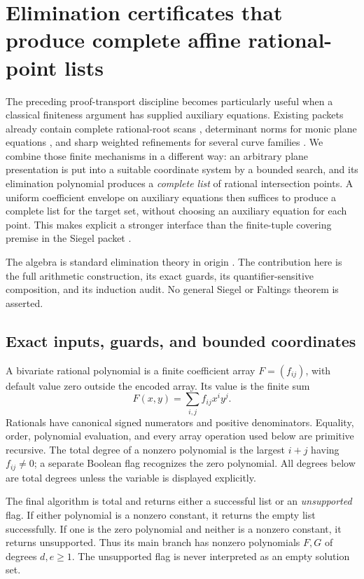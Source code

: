 \section{Elimination certificates that produce complete affine rational-point lists}
\label{sec:elimination}

The preceding proof-transport discipline becomes particularly useful when
a classical finiteness argument has supplied auxiliary equations.  Existing
packets already contain complete rational-root scans
\cite{repo-geometry}, determinant norms for monic plane equations
\cite{repo-demand}, and sharp weighted refinements for several curve
families \cite{repo-coherent}.  We combine those finite mechanisms in a
different way: an arbitrary plane presentation is put into a suitable
coordinate system by a bounded search, and its elimination polynomial
produces a \emph{complete list} of rational intersection points.  A uniform
coefficient envelope on auxiliary equations then suffices to produce a
complete list for the target set, without choosing an auxiliary equation
for each point.  This makes explicit a stronger interface than the
finite-tuple covering premise in the Siegel packet \cite{repo-siegel}.

The algebra is standard elimination theory in origin
\cite{sturmfels}.  The contribution here is the full arithmetic
construction, its exact guards, its quantifier-sensitive composition, and
its induction audit.  No general Siegel or Faltings theorem is asserted.

\subsection{Exact inputs, guards, and bounded coordinates}

A bivariate rational polynomial is a finite coefficient array
\(F=(f_{ij})\), with default value zero outside the encoded array.  Its
value is the finite sum
\[
 F(x,y)=\sum_{i,j}f_{ij}x^iy^j.
\]
Rationals have canonical signed numerators and positive denominators.
Equality, order, polynomial evaluation, and every array operation used
below are primitive recursive.  The total degree of a nonzero polynomial
is the largest \(i+j\) having \(f_{ij}\ne0\); a separate Boolean flag
recognizes the zero polynomial.  All degrees below are total degrees
unless the variable is displayed explicitly.

The final algorithm is total and returns either a successful list or an
\emph{unsupported} flag.  If either polynomial is a nonzero constant, it
returns the empty list successfully.  If one is the zero polynomial and
neither is a nonzero constant, it returns unsupported.  Thus its main
branch has nonzero polynomials \(F,G\) of degrees \(d,e\ge1\).
The unsupported flag is never interpreted as an empty solution set.

